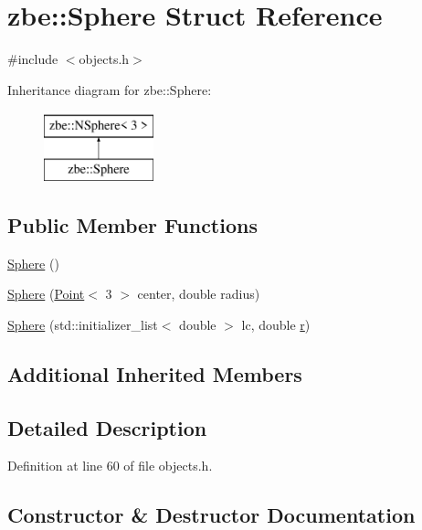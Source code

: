\hypertarget{structzbe_1_1_sphere}{}\section{zbe\+:\+:Sphere Struct Reference}
\label{structzbe_1_1_sphere}


{\ttfamily \#include $<$objects.\+h$>$}

Inheritance diagram for zbe\+:\+:Sphere\+:\begin{figure}[H]
\begin{center}
\leavevmode
\includegraphics[height=2.000000cm]{structzbe_1_1_sphere}
\end{center}
\end{figure}
\subsection*{Public Member Functions}
\begin{DoxyCompactItemize}
\item 
\hyperlink{structzbe_1_1_sphere_a5ee555bba4b00aa2f9443798db6ad1b2}{Sphere} ()
\item 
\hyperlink{structzbe_1_1_sphere_afa2b11ef41dc5b17c94011d8863ffe09}{Sphere} (\hyperlink{classzbe_1_1_point}{Point}$<$ 3 $>$ center, double radius)
\item 
\hyperlink{structzbe_1_1_sphere_ac274ea3214a97d200cdd7c62c046dd91}{Sphere} (std\+::initializer\+\_\+list$<$ double $>$ lc, double \hyperlink{structzbe_1_1_n_sphere_ac8fae694bd80717eec61699b4d5206c6}{r})
\end{DoxyCompactItemize}
\subsection*{Additional Inherited Members}


\subsection{Detailed Description}


Definition at line 60 of file objects.\+h.



\subsection{Constructor \& Destructor Documentation}
\hypertarget{structzbe_1_1_sphere_a5ee555bba4b00aa2f9443798db6ad1b2}{}

